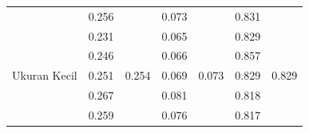 \documentclass[conference]{IEEEtran}
\begin{document}
\begin{table}[]
\begin{tabular}{|l|cc|cc|cc|}
                                                      & \multicolumn{1}{c|}{\cellcolor[HTML]{FFFFFF}0.256} & \cellcolor[HTML]{FFFFFF}                         & \multicolumn{1}{c|}{\cellcolor[HTML]{FFFFFF}0.073} & \cellcolor[HTML]{FFFFFF}                           & \multicolumn{1}{c|}{\cellcolor[HTML]{FFFFFF}0.831} & \cellcolor[HTML]{FFFFFF}                        \\ \cline{2-2} \cline{4-4} \cline{6-6}
                                                      & \multicolumn{1}{c|}{\cellcolor[HTML]{FFFFFF}0.231} & \cellcolor[HTML]{FFFFFF}                         & \multicolumn{1}{c|}{\cellcolor[HTML]{FFFFFF}0.065} & \cellcolor[HTML]{FFFFFF}                           & \multicolumn{1}{c|}{\cellcolor[HTML]{FFFFFF}0.829} & \cellcolor[HTML]{FFFFFF}                        \\ \cline{2-2} \cline{4-4} \cline{6-6}
                                                      & \multicolumn{1}{c|}{\cellcolor[HTML]{FFFFFF}0.246} & \cellcolor[HTML]{FFFFFF}                         & \multicolumn{1}{c|}{\cellcolor[HTML]{FFFFFF}0.066} & \cellcolor[HTML]{FFFFFF}                           & \multicolumn{1}{c|}{\cellcolor[HTML]{FFFFFF}0.857} & \cellcolor[HTML]{FFFFFF}                        \\ \cline{2-2} \cline{4-4} \cline{6-6}
  \multirow{-5}{*}{Ukuran Kecil}            & \multicolumn{1}{c|}{\cellcolor[HTML]{FFFFFF}0.251} & \multirow{-5}{*}{\cellcolor[HTML]{FFFFFF}0.254} & \multicolumn{1}{c|}{\cellcolor[HTML]{FFFFFF}0.069} & \multirow{-5}{*}{\cellcolor[HTML]{FFFFFF}0.073} & \multicolumn{1}{c|}{\cellcolor[HTML]{FFFFFF}0.829} & \multirow{-5}{*}{\cellcolor[HTML]{FFFFFF}0.829} \\ \hline
                                                      & \multicolumn{1}{c|}{\cellcolor[HTML]{FFFFFF}0.267} & \cellcolor[HTML]{FFFFFF}                         & \multicolumn{1}{c|}{\cellcolor[HTML]{FFFFFF}0.081} & \cellcolor[HTML]{FFFFFF}                           & \multicolumn{1}{c|}{\cellcolor[HTML]{FFFFFF}0.818} & \cellcolor[HTML]{FFFFFF}                        \\ \cline{2-2} \cline{4-4} \cline{6-6}
                                                      & \multicolumn{1}{c|}{\cellcolor[HTML]{FFFFFF}0.259} & \cellcolor[HTML]{FFFFFF}                         & \multicolumn{1}{c|}{\cellcolor[HTML]{FFFFFF}0.076} & \cellcolor[HTML]{FFFFFF}                           & \multicolumn{1}{c|}{\cellcolor[HTML]{FFFFFF}0.817} & \cellcolor[HTML]{FFFFFF}                        \\ \cline{2-2} \cline{4-4} \cline{6-6}

\end{tabular}
\end{table}
\end{document}
